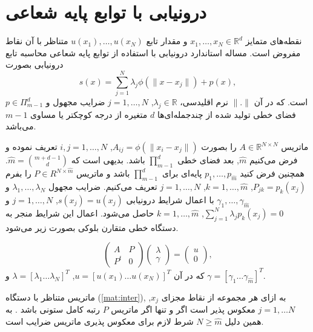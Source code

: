 \section{درونیابی با توابع پایه شعاعی}
نقطه‌های متمایز 
$x_1,\ldots,x_N\in\mathbb{R}^d$
و مقدار تابع
$u(x_1),\ldots,u(x_N)$
متناظر با آن نقاط مفروض است. مساله استاندارد درونیابی با استفاده از توابع پایه شعاعی محاسبه  تابع درونیابی بصورت
\begin{equation}
	s(x)=\sum^{N}_{j=1}\lambda_j\phi(\|x-x_j\|)+p(x),\label{eq:int}
\end{equation}
است. که در آن
$\|.\|$
نرم اقلیدسی، 
$\lambda_j\in \mathbb{R}$, $j=1,\ldots,N$
ضرایب مجهول و 
$p\in\Pi^{d}_{m-1}$
فضای خطی تولید شده از چندجمله‌ای‌ها 
$d$
متغیره از درجه کوچکتر یا مساوی 
$m-1$
می‌باشد.

ماتریس 
$A\in{\mathbb {R}^{N\times N}}$
را بصورت 
$A_{ij}=\phi(\|x_i-x_j\|)$, $i,j=1,\ldots,N$
تعریف نموده  و فرض می‌کنیم
$\hat{m}$,
بعد فضای خطی 
$\prod^d_{m-1}$
باشد. بدیهی است که 
$\hat{m}=\binom{m+d-1}{d}$.
همچنین فرض کنید
$p_1,\ldots,p_{\hat {m} }$
پایه‌ای برای
$\prod^d_{m-1}$
باشد و ماتریس 
$P\in R^{N\times{\hat m}}$
را بفرم 
$P_{jk}=p_k(x_j)$, $k=1,\ldots,\hat{m}$, $j=1,\ldots,N$
تعریف می‌کنیم. ضرایب مجهول 
$\lambda_1,\ldots ,\lambda_N$ 
و
$\gamma_1,\ldots,\gamma_{\hat{m}}$
با اعمال شرایط درونیابی 
$s(x_j)=u(x_j)$, $j=1,\ldots,N$
و
$\sum_{j=1}^{N}\lambda_jp_k(x_j)=0$, $k=1,\ldots,\hat{m}$
حاصل می‌شود. اعمال این شرایط منجر به دستگاه خطی متقارن بلوکی بصورت زیر می‌شود.

\begin{equation}
	\begin{pmatrix}
		A & P  \\
		P^t & 0
	\end{pmatrix}
	\begin{pmatrix}
		\lambda \\
		\gamma
	\end{pmatrix}=
	\begin{pmatrix}
		u \\
		0
	\end{pmatrix},\label{mat:inter}
\end{equation}
که در آن   
$u=[u(x_1)\ldots u(x_N)]^T$, $\lambda=[\lambda_1\ldots\lambda_N]^T$ 
و
$\gamma=[\gamma_1\ldots \gamma_{\hat{m}}]^T$.

ماتریس متناظر با دستگاه 
(\ref{mat:inter}),
به ازای هر مجموعه از نقاط مجزای
$x_j$, $j=1,\ldots N$ 
معکوس پذیر است اگر و تنها اگر ماتریس 
$P$
رتبه کامل ستونی باشد
\citep{Micchelli}.
به همین دلیل 
$N\geq\hat{m}$
شرط لازم برای معکوس پذیری ماتریس ضرایب است.

